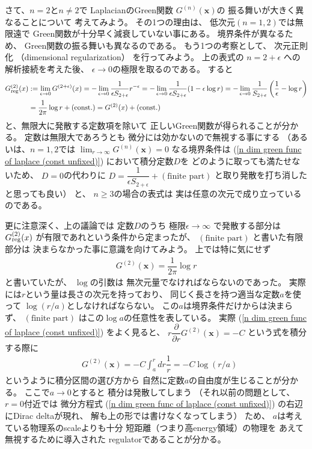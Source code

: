 さて、$n = 2$と$n \neq 2$で
LaplacianのGreen関数
$G^{(n)}(\bm{x})$の
振る舞いが大きく異なることについて
考えてみよう。
その1つの理由は、
低次元$(n = 1,2)$では無限遠で
Green関数が十分早く減衰していない事にある。
境界条件が異なるため、
Green関数の振る舞いも異なるのである。
もう1つの考察として、
次元正則化
（dimensional regularization）
を行ってみよう。
上の表式の
$n = 2 + \epsilon$
への解析接続を考えた後、
$\epsilon \to 0$の極限を取るのである。
すると
\begin{align}
    G^{(2)}_{\rm reg}(x)
&:=
    \lim_{\epsilon \to 0}
    G^{(2 + \epsilon)}(x)
=
    -
    \lim_{\epsilon \to 0}
    \dfrac{1}{
        \epsilon
        S_{2 + \epsilon}
    }
    r^{- \epsilon}
=
    -
    \lim_{\epsilon \to 0}
    \dfrac{1}{
        \epsilon
        S_{2 + \epsilon}
    }
    (1 - \epsilon \log r)
=
    -
    \lim_{\epsilon \to 0}
    \dfrac{1}{
        S_{2 + \epsilon}
    }
    \left(
        \dfrac{1}{\epsilon}
    -
        \log r
    \right)
\notag\\&=
    \dfrac{1}{
        2 \pi
    }
        \log r
    + (\text{const.})
=
    G^{(2)}(x)
    + (\text{const.})
\end{align}
と、無限大に発散する定数項を除いて
正しいGreen関数が得られることが分かる。
定数は無限大であろうとも
微分には効かないので無視する事にする
（あるいは、$n = 1, 2$では
$\lim_{r \to \infty}
    G^{(n)}(\bm{x}) = 0$
なる境界条件は
(\ref{n dim green func of laplace (const unfixed)})
において積分定数$D$を
どのように取っても満たせないため、
$D = 0$の代わりに
$D = \dfrac{1}
    {\epsilon S_{2 + \epsilon}}
    +
    (\text{finite part})$
と取り発散を打ち消したと思っても良い）
と、
$n \ge 3$の場合の表式は
実は任意の次元で成り立っているのである。

更に注意深く、上の議論では
定数$D$のうち
極限$\epsilon \to \infty$
で発散する部分は
$G^{(2)}_{\rm reg}(x)$
が有限であれという条件から定まったが、
$(\text{finite part})$
と書いた有限部分は
決まらなかった事に意識を向けてみよう。
上では特に気にせず
\begin{align}
    G^{(2)} (\bm{x})
    =
    \dfrac{1}{
        2 \pi
    }
        \log r
\end{align}
と書いていたが、
$\log$の引数は
無次元量でなければならないのであった。
実際には$r$という量は長さの次元を持っており、
同じく長さを持つ適当な定数$a$を使って
$\log (r/a)$としなければならない。
この$a$は境界条件だけからは決まらず、
$(\text{finite part})$
はこの$\log a$の任意性を表している。
実際
(\ref{n dim green func of laplace (const unfixed)})
をよく見ると、
$r
\dfrac{\partial}{\partial r}
G^{(2)}(\bm{x})
=
- C$
という式を積分する際に
\begin{align}
    &G^{(2)}(\bm{x})
    =
        - C
        \int_{a}^r dr
        \dfrac{1}{r}
    =
        - C
        \log (r/a)
\end{align}
というように積分区間の選び方から
自然に定数$a$の自由度が生じることが分かる。
ここで$a \to 0$とすると
積分は発散してしまう
（それ以前の問題として、
$r = 0$付近では
微分方程式
(\ref{n dim green func of laplace (const unfixed)})
の右辺にDirac deltaが現れ、
解も上の形では書けなくなってしまう）
ため、
$a$は考えている物理系のscaleよりも十分
短距離（つまり高energy領域）の物理を
あえて無視するために導入された
regulatorであることが分かる。

